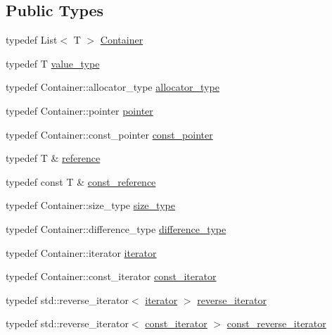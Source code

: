 \subsection*{Public Types}
\begin{DoxyCompactItemize}
\item 
typedef List$<$ T $>$ \hyperlink{classargs_1_1_nargs_value_flag_a27e748faa4e5ce69baf05a256e351d42}{Container}
\item 
typedef T \hyperlink{classargs_1_1_nargs_value_flag_a5d1d4da9eeb02c53489608346310af1b}{value\+\_\+type}
\item 
typedef Container\+::allocator\+\_\+type \hyperlink{classargs_1_1_nargs_value_flag_a9c828e4bc64b0037e7e50bb98595a47f}{allocator\+\_\+type}
\item 
typedef Container\+::pointer \hyperlink{classargs_1_1_nargs_value_flag_a3d6171281cd90e7488401a1f86e4a05a}{pointer}
\item 
typedef Container\+::const\+\_\+pointer \hyperlink{classargs_1_1_nargs_value_flag_a7e7d4871821e63a9db65652fa5dda864}{const\+\_\+pointer}
\item 
typedef T \& \hyperlink{classargs_1_1_nargs_value_flag_ab14706e23ffbc72dce81c7eac01e7337}{reference}
\item 
typedef const T \& \hyperlink{classargs_1_1_nargs_value_flag_af8e749af247a14c97883ae90294ef970}{const\+\_\+reference}
\item 
typedef Container\+::size\+\_\+type \hyperlink{classargs_1_1_nargs_value_flag_ad6cb71619fcb40524cf558993549a5cd}{size\+\_\+type}
\item 
typedef Container\+::difference\+\_\+type \hyperlink{classargs_1_1_nargs_value_flag_a889c8ec1eafd60023e417128cd103b18}{difference\+\_\+type}
\item 
typedef Container\+::iterator \hyperlink{classargs_1_1_nargs_value_flag_aeaf17e645a109333204dcb7c954a2473}{iterator}
\item 
typedef Container\+::const\+\_\+iterator \hyperlink{classargs_1_1_nargs_value_flag_a115760faf263d007148b30c99d8e6bdc}{const\+\_\+iterator}
\item 
typedef std\+::reverse\+\_\+iterator$<$ \hyperlink{classargs_1_1_nargs_value_flag_aeaf17e645a109333204dcb7c954a2473}{iterator} $>$ \hyperlink{classargs_1_1_nargs_value_flag_a6fcba5bdf062ce3cc11e25435ec56eae}{reverse\+\_\+iterator}
\item 
typedef std\+::reverse\+\_\+iterator$<$ \hyperlink{classargs_1_1_nargs_value_flag_a115760faf263d007148b30c99d8e6bdc}{const\+\_\+iterator} $>$ \hyperlink{classargs_1_1_nargs_value_flag_a5c004f10973a047ecd2067454e536d41}{const\+\_\+reverse\+\_\+iterator}
\end{DoxyCompactItemize}
